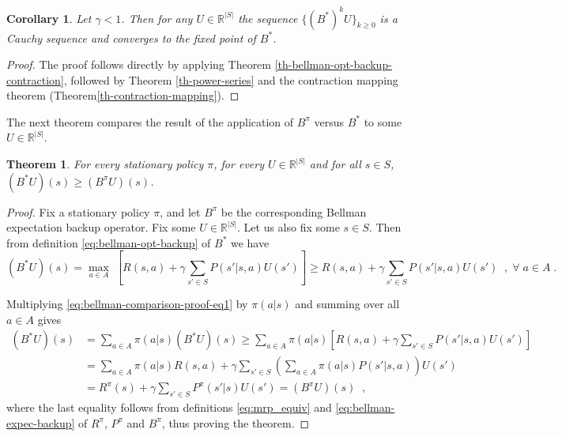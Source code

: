 \documentclass{article}
\newtheorem{theorem}{Theorem}[section]
\newtheorem{corollary}{Corollary}[theorem]
\theoremstyle{definition}
\theoremstyle{remark}
\begin{document}
\begin{corollary}
Let $\gamma < 1$. Then for any $U \in \mathbb{R}^{|S|}$ the sequence $\{(B^{\ast})^{k}U\}_{k \geq 0}$ is a Cauchy sequence and converges to the fixed point of $B^{\ast}$.
\label{cor-bellman-opt-backup-repeated}
\end{corollary}

\begin{proof}
The proof follows directly by applying Theorem \ref{th-bellman-opt-backup-contraction}, followed by Theorem \ref{th-power-series} and the contraction mapping theorem (Theorem\ref{th-contraction-mapping}).
\end{proof}

The next theorem compares the result of the application of $B^{\pi}$ versus $B^{\ast}$ to some $U \in \mathbb{R}^{|S|}$.

\begin{theorem}
For every stationary policy $\pi$, for every $U \in \mathbb{R}^{|S|}$ and for all $s \in S$, $(B^{\ast}U)(s) \geq (B^{\pi}U)(s)$.
\label{th-bellman-operator-comparison}
\end{theorem}

\begin{proof}
Fix a stationary policy $\pi$, and let $B^{\pi}$ be the corresponding Bellman expectation backup operator. Fix some $U \in \mathbb{R}^{|S|}$. Let us also fix some $s \in S$. Then from definition \eqref{eq:bellman-opt-backup} of $B^{\ast}$ we have
\begin{equation}
(B^{\ast}U)(s) = \underset{a \in A}{\max} \; \left[ R(s,a) + \gamma \sum_{s' \in S} P(s'|s,a)U(s') \right] \geq R(s,a) + \gamma \sum_{s' \in S} P(s'|s,a)U(s') \;\; , \; \forall \; a \in A \;.
\label{eq:bellman-comparison-proof-eq1}
\end{equation}

Multiplying \eqref{eq:bellman-comparison-proof-eq1} by $\pi(a|s)$ and summing over all $a \in A$ gives
\begin{equation}
\begin{split}
(B^{\ast}U)(s) &= \sum_{a \in A} \pi(a|s) (B^{\ast}U)(s) \geq \sum_{a \in A} \pi(a|s) \left[ R(s,a) + \gamma \sum_{s' \in S} P(s'|s,a)U(s') \right] \\
&= \sum_{a \in A} \pi(a|s)R(s,a) + \gamma \sum_{s' \in S} \left( \sum_{a \in A} \pi(a|s)P(s'|s,a) \right) U(s') \\
&= R^{\pi}(s) + \gamma \sum_{s' \in S} P^{\pi}(s'|s)U(s') = (B^{\pi}U)(s) \;\;,
\end{split}
\label{eq:bellman-comparison-proof-eq2}
\end{equation}
where the last equality follows from definitions \eqref{eq:mrp_equiv} and \eqref{eq:bellman-expec-backup} of $R^{\pi}$, $P^{\pi}$ and $B^{\pi}$, thus proving the theorem.
\end{proof}
\end{document}
